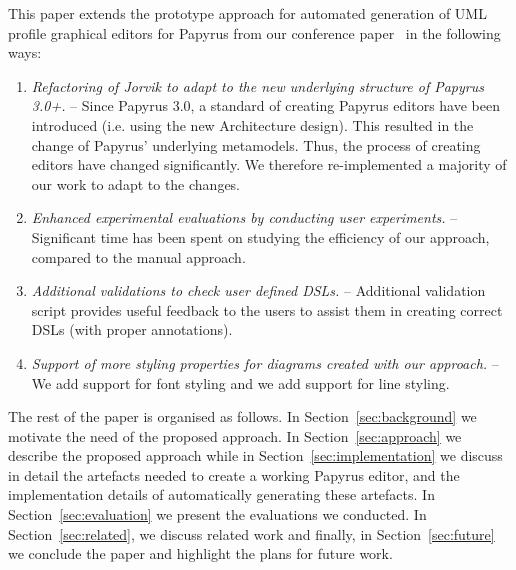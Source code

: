 This paper extends the prototype approach for automated generation of UML profile graphical editors for Papyrus from our conference paper~\cite{zolotas2018towards} in the following ways:
\begin{enumerate}
	\item \textit{Refactoring of \textit{Jorvik} to adapt to the new underlying structure of Papyrus 3.0+.} -- 
	Since Papyrus 3.0, a standard of creating Papyrus editors have been introduced (i.e. using the new Architecture design). This resulted in the change of Papyrus' underlying metamodels. Thus, the process of creating editors have changed significantly.
	We therefore re-implemented a majority of our work to adapt to the changes. 
	\item \textit{Enhanced experimental evaluations by conducting user experiments.} --
	Significant time has been spent on studying the efficiency of our approach, compared to the manual approach.
	\item \textit{Additional validations to check user defined DSLs.} -- Additional validation script provides useful feedback to the users to assist them in creating correct DSLs (with proper annotations).
	\item \textit{Support of more styling properties for diagrams created with our approach.} -- We add support for font styling and we add support for line styling.

\end{enumerate}
The rest of the paper is organised as follows. 
In Section~\ref{sec:background} we motivate the need of the proposed approach. 
In Section~\ref{sec:approach} we describe the proposed approach while 
in Section~\ref{sec:implementation} we discuss in detail the artefacts needed to create a working Papyrus editor, and the implementation details of automatically generating these artefacts. 
In Section~\ref{sec:evaluation} we present the evaluations we conducted.
In Section~\ref{sec:related}, we discuss related work and finally, in Section~\ref{sec:future} we conclude the paper and highlight the plans for future work.
